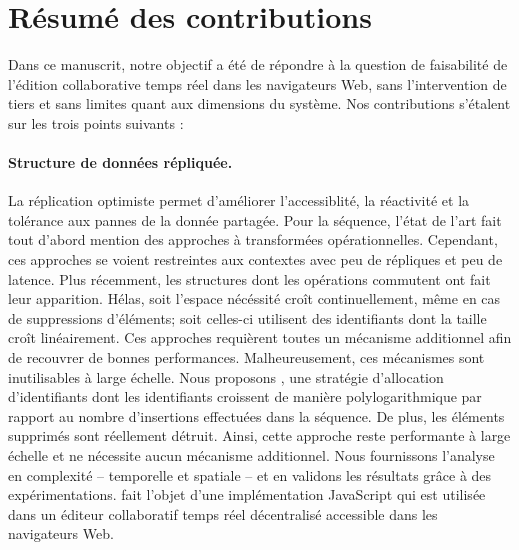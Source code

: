 
\section{Résumé des contributions}
\label{conclu:sec:summary}

Dans ce manuscrit, notre objectif a été de répondre à la question de faisabilité
de l'édition collaborative temps réel dans les navigateurs Web, sans
l'intervention de tiers et sans limites quant aux dimensions du système. Nos
contributions s'étalent sur les trois points suivants :

\paragraph{Structure de données répliquée.} La réplication optimiste permet
d'améliorer l'accessiblité, la réactivité et la tolérance aux pannes de la
donnée partagée. Pour la séquence, l'état de l'art fait tout d'abord mention des
approches à transformées opérationnelles. Cependant, ces approches se voient
restreintes aux contextes avec peu de répliques et peu de latence. Plus
récemment, les structures dont les opérations commutent ont fait leur
apparition. Hélas, soit l'espace nécéssité croît continuellement, même en cas de
suppressions d'éléments; soit celles-ci utilisent des identifiants dont la
taille croît linéairement. Ces approches requièrent toutes un mécanisme
additionnel afin de recouvrer de bonnes performances. Malheureusement, ces
mécanismes sont inutilisables à large échelle. Nous proposons \LSEQ, une
stratégie d'allocation d'identifiants dont les identifiants croissent de manière
polylogarithmique par rapport au nombre d'insertions effectuées dans la
séquence. De plus, les éléments supprimés sont réellement détruit. Ainsi, cette
approche reste performante à large échelle et ne nécessite aucun mécanisme
additionnel.  Nous fournissons l'analyse en complexité -- temporelle et spatiale
-- et en validons les résultats grâce à des expérimentations. \LSEQ fait l'objet
d'une implémentation JavaScript qui est utilisée dans un éditeur collaboratif
temps réel décentralisé accessible dans les navigateurs Web.

